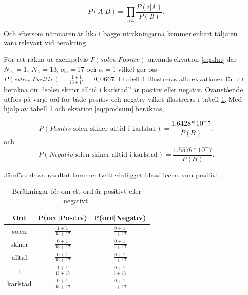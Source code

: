 \documentclass{kaumasters} %
\begin{document}
\begin{equation}\label{eq:prodsum}
P(A|B) = \prod\limits_{i \epsilon B} \frac{P(i|A)}{P(B)},
\end{equation}

Och eftersom nämnaren är lika i bägge uträkningarna kommer enbart täljaren vara relevant vid beräkning.

För att räkna ut exempelvis $P(solen|Positiv)$ används ekvation \ref{eq:slut} där $N_{b_w} = 1$, $N_A= 13$, $\alpha_n = 17$ och $\alpha = 1$ vilket ger oss $P(solen|Positiv) = \frac{1 + 1}{13 + 17} = 0,0667$. I tabell \ref{tab:ekv} illustreras alla ekvationer för att beräkna om “solen skiner alltid i karlstad” är positiv eller negativ. Ovanstående utförs på varje ord för både positiv och negativ vilket illustreras i tabell \ref{tab:ekv}. Med hjälp av tabell \ref{tab:ekv} och ekvation \ref{eq:prodsum} beräknas, 

\begin{equation}
P(Positiv|\textrm{solen skiner alltid i karlstad}) = \frac{1.6428 * 10^-7}{P(B)},
\end{equation}
och
\begin{equation}
P(Negativ|\textrm{solen skiner alltid i karlstad}) = \frac{1.5576 * 10^-7}{P(B)}.
\end{equation}

Jämförs dessa resultat kommer twitterinlägget klassificeras som positivt.

\begin{table}[H]
\centering
\caption{Beräkningar för om ett ord är positivt eller negativt.}
\label{tab:ekv}
    \begin{tabular}{ccc}
    \toprule
    \textbf{Ord} & \textbf{P(ord|Positiv)} & \textbf{P(ord|Negativ)} \\
    \midrule
    solen & $\frac{1 + 1}{13 + 17} $ & $\frac{0 + 1}{6 + 17} $\\
    skiner & $\frac{0 + 1}{13 + 17} $ & $\frac{0 + 1}{6 + 17}$ \\
    alltid & $\frac{0 + 1}{13 + 17}$ & $\frac{0 + 1}{6 + 17}$ \\
    i & $\frac{1 + 1}{13 + 17} $& $\frac{0 + 1}{6 + 17}$ \\
karlstad & $\frac{0 + 1}{13 + 17}$ & $\frac{0 + 1}{6 + 17}$ \\
    \bottomrule
\end{tabular}
\end{table}
\end{document}
